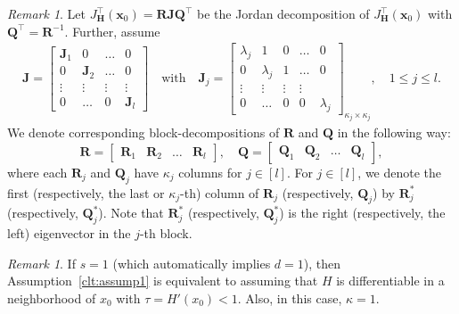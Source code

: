 \documentclass[12pt]{amsart}
\theoremstyle{plain}
\theoremstyle{remark}
\newtheorem{remark}[theorem]{Remark}
\numberwithin{equation}{section}
\begin{document}
\begin{remark}
    Let $J^{\top}_{\boldsymbol{H}}(\boldsymbol{x}_0) = \boldsymbol{R}\boldsymbol{J}\boldsymbol{Q}^{\top}$ be the Jordan decomposition of $J^{\top}_{\boldsymbol{H}}(\boldsymbol{x}_0)$ with $\boldsymbol{Q}^{\top} = \boldsymbol{R}^{-1}$. Further, assume 
    \begin{align*}
        \boldsymbol{J} = \begin{bmatrix}
            \boldsymbol{J}_1 & 0 & \ldots & 0 \\ 0 & \boldsymbol{J}_2 & \ldots & 0 \\ \vdots & \vdots & \vdots & \vdots \\ 0 & \ldots & 0 & \boldsymbol{J}_l 
        \end{bmatrix} \quad \text{with} \quad \boldsymbol{J}_j = \begin{bmatrix}
            \lambda_j & 1 & 0 & \ldots & 0 \\ 0 & \lambda_j & 1 & \ldots & 0 \\ \vdots & \vdots & \vdots & \vdots \\ 0 & \ldots & 0 & 0 & \lambda_j
        \end{bmatrix}_{\kappa_j \times \kappa_j}, \quad 1 \leq j \leq l.
    \end{align*}
    We denote corresponding block-decompositions of $\boldsymbol{R}$ and $\boldsymbol{Q}$ in the following way:
    \[
       \boldsymbol{R} = \begin{bmatrix}
            \boldsymbol{R}_1 & \boldsymbol{R}_2 & \ldots & \boldsymbol{R}_l\end{bmatrix}, \quad \boldsymbol{Q} = \begin{bmatrix}
            \boldsymbol{Q}_1 & \boldsymbol{Q}_2 & \ldots & \boldsymbol{Q}_l\end{bmatrix},
    \]
    where each $\boldsymbol{R}_j$ and $\boldsymbol{Q}_j$ have $\kappa_j$ columns for $j \in [l]$. For $j \in [l]$, %
    we denote the first (respectively, the last or $\kappa_j$-th) %
    column of $\boldsymbol{R}_j$ (respectively, $\boldsymbol{Q}_j$) by $\boldsymbol{R}^*_{j}$ (respectively, $\boldsymbol{Q}^*_{j}$). Note that $\boldsymbol{R}^*_{j}$ (respectively, $\boldsymbol{Q}^*_{j}$) is the right (respectively, the left) eigenvector in the $j$-th block.
\end{remark}

\begin{remark}\label{rem:clt:assump1-1d}
    If $s = 1$ (which automatically implies $d=1$), then Assumption~\ref{clt:assump1} is equivalent to assuming that $H$ is differentiable in a neighborhood of $x_0$ with $\tau = H'(x_0) < 1$. Also, in this case, $\kappa = 1$.
\end{remark}
\end{document}
